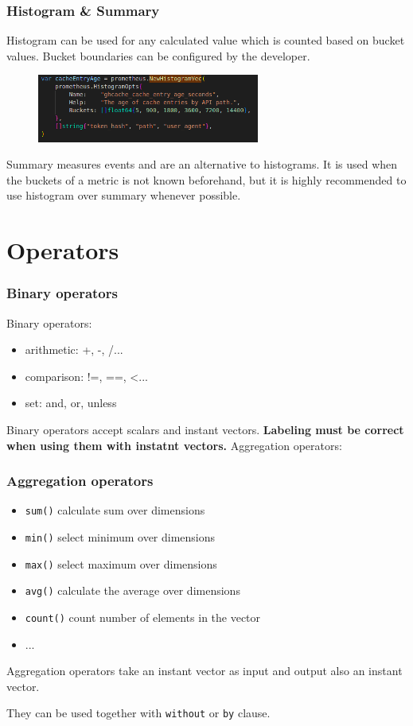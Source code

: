 \documentclass[xcolor=dvipsnames]{beamer}
\begin{document}
\begin{frame}
 \frametitle{Histogram \& Summary}
Histogram can be used for any calculated value which is counted based on bucket values. Bucket boundaries can be configured by the developer.
\begin{figure}
\centering
\includegraphics[width=0.65\textwidth]{code.png}

\end{figure}


Summary measures events and are an alternative to histograms.  It is used when the buckets of a metric is not known beforehand, but it is highly recommended to use histogram over summary whenever possible.

\end{frame}


\section{Operators}
\begin{frame}
 \frametitle{Binary operators}
Binary operators:
\begin{itemize}
\item arithmetic: +, -, /...
\item comparison: !=, ==, <...
\item set: and, or, unless
\end{itemize}
Binary operators accept scalars and instant vectors. \textbf{Labeling must be correct when using them with instatnt vectors.}
Aggregation operators:
\end{frame}

\begin{frame}
\frametitle{Aggregation operators}
\begin{itemize}
\item \texttt{sum()} calculate sum over dimensions
\item \texttt{min()} select minimum over dimensions
\item \texttt{max()} select maximum over dimensions
\item \texttt{avg()} calculate the average over dimensions
\item \texttt{count()} count number of elements in the vector
\item ...
\end{itemize}
Aggregation operators take an instant vector as input and output also an instant vector.

\vspace{0.1cm}
They can be used together with \texttt{without} or \texttt{by} clause.
\end{frame}
\end{document}
